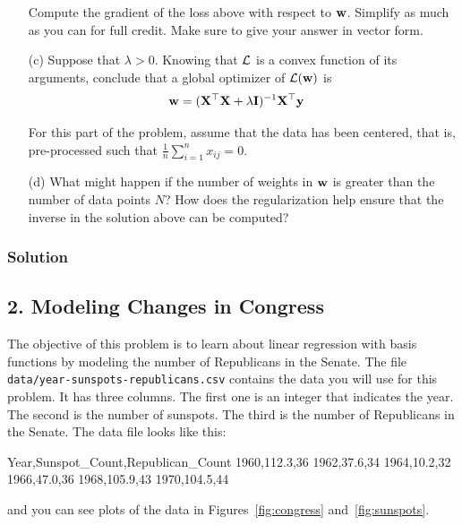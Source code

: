 \documentclass[submit]{harvardml}
\begin{document}
\begin{problem}
\begin{itemize}
Compute the gradient of the loss above with respect to $\mathbf{w}$.
Simplify as much as you can for full credit.  Make sure to give your
answer in vector form.

\item[(c)] Suppose that $\lambda > 0$. Knowing that $\mathcal{L}$ is a convex function
    of its arguments, conclude that a global optimizer of
    $\mathcal{L}(\mathbf{w})$ is
    \begin{align}
      \mathbf{w} &= (\mathbf{X}^\top \mathbf{X} + \lambda \mathbf{I})^{-1} \mathbf{X}^\top \mathbf{y}
    \end{align}

For this part of the problem, assume that the data has been centered,
that is, pre-processed such that $\frac{1}{n} \sum_{i=1}^n x_{ij} = 0
$.

\item[(d)] What might happen if the number of weights in $\mathbf{w}$ is
  greater than the number of data points $N$?  How does the
  regularization help ensure that the inverse in the solution above
  can be computed?  

\end{itemize}

\end{problem}


\subsubsection*{Solution}





\newpage
\subsection*{2. Modeling Changes in Congress}
 The objective of this problem is to learn about linear regression
 with basis functions by modeling the number of Republicans in the
 Senate. The file \verb|data/year-sunspots-republicans.csv| contains the
 data you will use for this problem.  It has three columns.  The first
 one is an integer that indicates the year.  The second is the number
 of sunspots.  The third is the number of Republicans in the Senate.
 The data file looks like this:
 \begin{csv}
Year,Sunspot_Count,Republican_Count
1960,112.3,36
1962,37.6,34
1964,10.2,32
1966,47.0,36
1968,105.9,43
1970,104.5,44
\end{csv}
and you can see plots of the data in Figures~\ref{fig:congress}
and~\ref{fig:sunspots}. 
\end{document}
